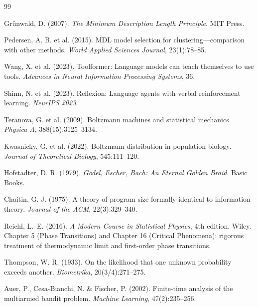 \documentclass[12pt]{article}
\theoremstyle{definition}
\begin{document}
\begin{thebibliography}{99}

Gr{\"u}nwald, D. (2007).
\newblock \emph{The Minimum Description Length Principle}.
\newblock MIT Press.

Pedersen, A. B. et al. (2015).
\newblock MDL model selection for clustering---comparison with other methods.
\newblock \emph{World Applied Sciences Journal}, 23(1):78--85.

Wang, X. et al. (2023).
\newblock Toolformer: Language models can teach themselves to use tools.
\newblock \emph{Advances in Neural Information Processing Systems}, 36.

Shinn, N. et al. (2023).
\newblock Reflexion: Language agents with verbal reinforcement learning.
\newblock \emph{NeurIPS 2023}.

Teranova, G. et al. (2009).
\newblock Boltzmann machines and statistical mechanics.
\newblock \emph{Physica A}, 388(15):3125--3134.

Kwasnicky, G. et al. (2022).
\newblock Boltzmann distribution in population biology.
\newblock \emph{Journal of Theoretical Biology}, 545:111--120.

Hofstadter, D. R. (1979).
\newblock \emph{G{\"o}del, Escher, Bach: An Eternal Golden Braid}.
\newblock Basic Books.

Chaitin, G. J. (1975).
\newblock A theory of program size formally identical to information theory.
\newblock \emph{Journal of the ACM}, 22(3):329--340.

Reichl, L.\ E. (2016).
\newblock \emph{A Modern Course in Statistical Physics}, 4th edition.
\newblock Wiley. Chapter 5 (Phase Transitions) and Chapter 16 (Critical Phenomena): rigorous treatment of thermodynamic limit and first-order phase transitions.

Thompson, W. R. (1933).
\newblock On the likelihood that one unknown probability exceeds another.
\newblock \emph{Biometrika}, 20(3/4):271--275.

Auer, P., Cesa-Bianchi, N. \& Fischer, P. (2002).
\newblock Finite-time analysis of the multiarmed bandit problem.
\newblock \emph{Machine Learning}, 47(2):235--256.


\end{thebibliography}
\end{document}
